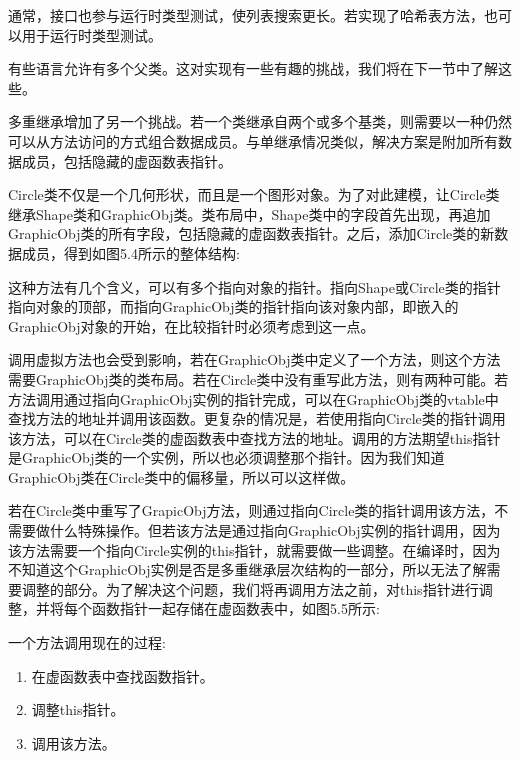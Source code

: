 通常，接口也参与运行时类型测试，使列表搜索更长。若实现了哈希表方法，也可以用于运行时类型测试。

有些语言允许有多个父类。这对实现有一些有趣的挑战，我们将在下一节中了解这些。


多重继承增加了另一个挑战。若一个类继承自两个或多个基类，则需要以一种仍然可以从方法访问的方式组合数据成员。与单继承情况类似，解决方案是附加所有数据成员，包括隐藏的虚函数表指针。

Circle类不仅是一个几何形状，而且是一个图形对象。为了对此建模，让Circle类继承Shape类和GraphicObj类。类布局中，Shape类中的字段首先出现，再追加GraphicObj类的所有字段，包括隐藏的虚函数表指针。之后，添加Circle类的新数据成员，得到如图5.4所示的整体结构:


这种方法有几个含义，可以有多个指向对象的指针。指向Shape或Circle类的指针指向对象的顶部，而指向GraphicObj类的指针指向该对象内部，即嵌入的GraphicObj对象的开始，在比较指针时必须考虑到这一点。

调用虚拟方法也会受到影响，若在GraphicObj类中定义了一个方法，则这个方法需要GraphicObj类的类布局。若在Circle类中没有重写此方法，则有两种可能。若方法调用通过指向GraphicObj实例的指针完成，可以在GraphicObj类的vtable中查找方法的地址并调用该函数。更复杂的情况是，若使用指向Circle类的指针调用该方法，可以在Circle类的虚函数表中查找方法的地址。调用的方法期望this指针是GraphicObj类的一个实例，所以也必须调整那个指针。因为我们知道GraphicObj类在Circle类中的偏移量，所以可以这样做。

若在Circle类中重写了GrapicObj方法，则通过指向Circle类的指针调用该方法，不需要做什么特殊操作。但若该方法是通过指向GraphicObj实例的指针调用，因为该方法需要一个指向Circle实例的this指针，就需要做一些调整。在编译时，因为不知道这个GraphicObj实例是否是多重继承层次结构的一部分，所以无法了解需要调整的部分。为了解决这个问题，我们将再调用方法之前，对this指针进行调整，并将每个函数指针一起存储在虚函数表中，如图5.5所示:


一个方法调用现在的过程:

\begin{enumerate}
\item
在虚函数表中查找函数指针。

\item
调整this指针。

\item
调用该方法。
\end{enumerate}

